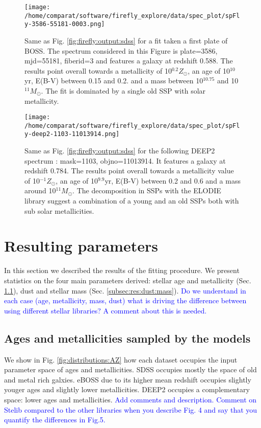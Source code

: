 \documentclass[onecolumn]{aa}
\begin{document}
\begin{figure*}
\begin{center}
\caption{\label{fig:firefly:output:boss}
Same as Fig. \ref{fig:firefly:output:sdss} for a fit taken a first plate of BOSS. 
The spectrum considered in this Figure is plate=3586, mjd=55181, fiberid=3 and features a galaxy at redshift 0.588.
The results point overall towards a metallicity of 10$^{0.2}Z_\odot$, an age of 10$^{10}$yr, E(B-V) between 0.15 and 0.2. and a mass between 10$^{10.75}$ and 10$^{11}M_\odot$. 
The fit is dominated by a single old SSP with solar metallicity.}
\texttt{[image: /home/comparat/software/firefly\_explore/data/spec\_plot/spFly-3586-55181-0003.png]}
\end{center}
\end{figure*}

\begin{figure*}
\begin{center}
\caption{\label{fig:firefly:output:deep2}
Same as Fig. \ref{fig:firefly:output:sdss} for the following DEEP2 spectrum : mask=1103, objno=11013914. 
It features a galaxy at redshift 0.784.
The results point overall towards a metallicity value of 10$^{-1}Z_\odot$, an age of 10$^{9.9}$yr, E(B-V) between 0.2 and 0.6 and a mass around 10$^{11}M_\odot$. 
The decomposition in SSPs with the ELODIE library suggest a combination of a young and an old SSPs both with sub solar metallicities. }
\texttt{[image: /home/comparat/software/firefly\_explore/data/spec\_plot/spFly-deep2-1103-11013914.png]}
\end{center}
\end{figure*}

\clearpage
\section{Resulting parameters}
\label{sec:results:params}

In this section we described the results of the fitting procedure. 
We present statistics on the four main parameters derived: stellar age and metallicity (Sec. \ref{subsec:res:age:metal}), dust and stellar mass (Sec. \ref{subsec:res:dust:mass}).
\textcolor{blue}{Do we understand in each case (age, metallicity, mass, dust) what is driving the difference between using different stellar libraries? A comment about this is needed.}

\subsection{Ages and metallicities sampled by the models}
\label{subsec:res:age:metal}
We show in Fig. \ref{fig:distributions:AZ} how each dataset occupies the input parameter space of ages and metallicities. 
SDSS occupies mostly the space of old and metal rich galxies. 
eBOSS due to its higher mean redshift occupies slightly youger ages and slightly lower metallicities. 
DEEP2 occupies a complementary space: lower ages and metallicities.
\textcolor{blue}{Add comments and description. Comment on Stelib compared to the other libraries when you
describe Fig. 4 and say that you quantify the differences in Fig.5.}
\end{document}
